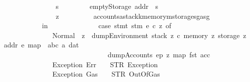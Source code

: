 \begin{isabellebody}
\ \ \ \ \ \ \ \ \ \ \ \ \ \ \ s{\isacharprime}{\kern0pt}\ \ \ \ \ \ \ \ {\isacharequal}{\kern0pt}\ emptyStorage\ {\isacharparenleft}{\kern0pt}addr\ {\isacharcolon}{\kern0pt}{\isacharequal}{\kern0pt}\ s{\isacharparenright}{\kern0pt}{\isacharsemicolon}{\kern0pt}\isanewline
\ \ \ \ \ \ \ \ \ \ \ \ \ \ \ z\ \ \ \ \ \ \ \ \ {\isacharequal}{\kern0pt}\ {\isasymlparr}accounts{\isacharequal}{\kern0pt}a{\isacharcomma}{\kern0pt}stack{\isacharequal}{\kern0pt}k{\isacharcomma}{\kern0pt}memory{\isacharequal}{\kern0pt}m{\isacharcomma}{\kern0pt}storage{\isacharequal}{\kern0pt}s{\isacharprime}{\kern0pt}{\isacharcomma}{\kern0pt}gas{\isacharequal}{\kern0pt}g{\isasymrparr}\ \isanewline
\ \ \ \ \ \ \ \ \ \ \ in\ {\isacharparenleft}{\kern0pt}\isanewline
\ \ \ \ \ \ \ \ \ \ \ \ \ case\ {\isacharparenleft}{\kern0pt}stmt\ stm\ e\ c\ z{\isacharparenright}{\kern0pt}\ of\isanewline
\ \ \ \ \ \ \ \ \ \ \ \ \ \ Normal\ {\isacharparenleft}{\kern0pt}{\isacharparenleft}{\kern0pt}{\isacharparenright}{\kern0pt}{\isacharcomma}{\kern0pt}\ z{\isacharprime}{\kern0pt}{\isacharparenright}{\kern0pt}\ {\isasymRightarrow}\ {\isacharparenleft}{\kern0pt}dump\isactrlsub E\isactrlsub n\isactrlsub v\isactrlsub i\isactrlsub r\isactrlsub o\isactrlsub n\isactrlsub m\isactrlsub e\isactrlsub n\isactrlsub t\ {\isacharparenleft}{\kern0pt}stack\ z{\isacharprime}{\kern0pt}{\isacharparenright}{\kern0pt}\ c\ {\isacharparenleft}{\kern0pt}memory\ z{\isacharprime}{\kern0pt}{\isacharparenright}{\kern0pt}\ {\isacharparenleft}{\kern0pt}storage\ z{\isacharprime}{\kern0pt}\ addr{\isacharparenright}{\kern0pt}\ e\ {\isacharparenleft}{\kern0pt}map\ {\isacharparenleft}{\kern0pt}{\isasymlambda}\ {\isacharparenleft}{\kern0pt}a{\isacharcomma}{\kern0pt}b{\isacharcomma}{\kern0pt}c{\isacharparenright}{\kern0pt}{\isachardot}{\kern0pt}\ a{\isacharparenright}{\kern0pt}\ dat{\isacharparenright}{\kern0pt}{\isacharparenright}{\kern0pt}\isanewline
\ \ \ \ \ \ \ \ \ \ \ \ \ \ \ \ \ \ \ \ \ \ \ \ \ \ \ \ \ {\isacharplus}{\kern0pt}\ {\isacharparenleft}{\kern0pt}dump\isactrlsub A\isactrlsub c\isactrlsub c\isactrlsub o\isactrlsub u\isactrlsub n\isactrlsub t\isactrlsub s\ ep\ z{\isacharprime}{\kern0pt}\ {\isacharparenleft}{\kern0pt}map\ fst\ acc{\isacharparenright}{\kern0pt}{\isacharparenright}{\kern0pt}\isanewline
\ \ \ \ \ \ \ \ \ \ \ \ \ {\isacharbar}{\kern0pt}\ Exception\ Err\ \ \ {\isasymRightarrow}\ STR\ {\isacharprime}{\kern0pt}{\isacharprime}{\kern0pt}Exception{\isacharprime}{\kern0pt}{\isacharprime}{\kern0pt}\isanewline
\ \ \ \ \ \ \ \ \ \ \ \ \ {\isacharbar}{\kern0pt}\ Exception\ Gas\ \ \ {\isasymRightarrow}\ STR\ {\isacharprime}{\kern0pt}{\isacharprime}{\kern0pt}OutOfGas{\isacharprime}{\kern0pt}{\isacharprime}{\kern0pt}{\isacharparenright}{\kern0pt}{\isacharparenright}{\kern0pt}{\isachardoublequoteclose}\isanewline

\end{isabellebody}
